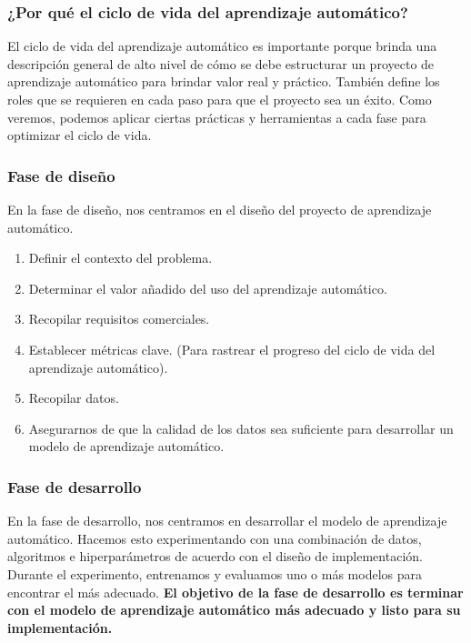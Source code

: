 \documentclass[10pt]{book}
\begin{document}
\subsubsection{¿Por qué el ciclo de vida del aprendizaje automático?}
El ciclo de vida del aprendizaje automático es importante porque brinda una descripción general de alto nivel de cómo se debe estructurar un proyecto de aprendizaje automático para brindar valor real y práctico. También define los roles que se requieren en cada paso para que el proyecto sea un éxito. Como veremos, podemos aplicar ciertas prácticas y herramientas a cada fase para optimizar el ciclo de vida.

\subsubsection{Fase de diseño}
En la fase de diseño, nos centramos en el diseño del proyecto de aprendizaje automático.
\begin{enumerate}
	\item Definir el contexto del problema.
	\item Determinar el valor añadido del uso del aprendizaje automático.
	\item Recopilar requisitos comerciales.
	\item Establecer métricas clave. (Para rastrear el progreso del ciclo de vida del aprendizaje automático).
	\item Recopilar datos.
	\item Asegurarnos de que la calidad de los datos sea suficiente para desarrollar un modelo de aprendizaje automático.
\end{enumerate}

\subsubsection{Fase de desarrollo}
En la fase de desarrollo, nos centramos en desarrollar el modelo de aprendizaje automático. Hacemos esto experimentando con una combinación de datos, algoritmos e hiperparámetros de acuerdo con el diseño de implementación. Durante el experimento, entrenamos y evaluamos uno o más modelos para encontrar el más adecuado. \textbf{El objetivo de la fase de desarrollo es terminar con el modelo de aprendizaje automático más adecuado y listo para su implementación.}
\end{document}
